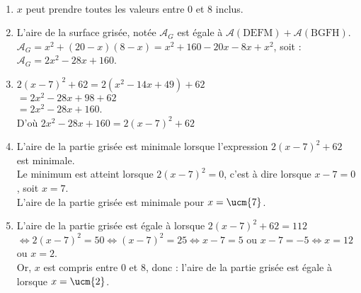 \ \\ [-5mm]
   \begin{enumerate}
      \item $x$ peut prendre toutes les valeurs {\blue entre 0 et 8 inclus}.
      \item L'aire de la surface grisée, notée $\mathcal{A}_G$ est égale à $\mathcal{A}(\text{DEFM})+\mathcal{A}(\text{BGFH})$. \\
         $\mathcal{A}_G =x^2+(20-x)(8-x) = x^2+160-20x-8x+x^2$, soit : \\
         {\blue $\mathcal{A}_G =2x^2 - 28x +160$}.
      \item $2(x - 7)^2 + 62 =2(x^2-14x+49)+62$ \\
         \hspace*{2.45cm} $=2x^2-28x+98+62$ \\
         \hspace*{2.45cm} $=2x^2-28x+160$. \\
         D'où {\blue $2x^2-28x+160 =2(x-7)^2+62$}
      \item L'aire de la partie grisée est minimale lorsque l'expression $2(x-7)^2+62$ est minimale. \\
         Le minimum est atteint lorsque $2(x-7)^2 =0$, c'est à dire lorsque $x-7 =0$, soit $x =7$. \\
         {\blue L'aire de la partie grisée est minimale pour $x =\ucm{7}$.}
      \item L'aire de la partie grisée est égale à  lorsque $2(x-7)^2+62 =112$ \\
         $\iff 2(x-7)^2 =50 \iff (x-7)^2=25 \iff x-7=5$ ou $x-7=-5 \iff x=12$ ou $x=2$. \\
         Or, $x$ est compris entre 0 et 8, donc : {\blue l'aire de la partie grisée est égale à  lorsque $x=\ucm{2}$.}
\end{enumerate}
